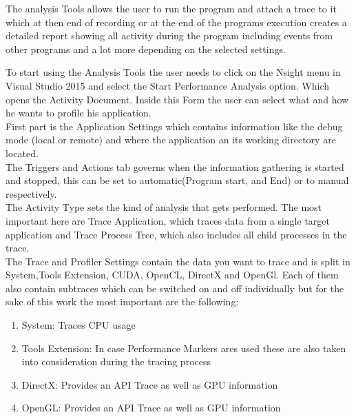 The analysis Tools allows the user to run the program and attach a trace to it which at then end of recording or at the end of the programs execution creates a detailed report showing all activity during the program including events from other programs and a lot more depending on the selected settings.

To start using the Analysis Tools the user needs to click on the Nsight menu in Visual Studio 2015 and select the Start Performance Analysis option. Which opens the Activity Document. Inside this Form the user can select what and how he wants to profile his application.\\
First part is the Application Settings which contains information like the debug mode (local or remote) and where the application an its working directory are located.\\
The Triggers and Actions tab governs when the information gathering is started and stopped, this can be set to automatic(Program start, and End) or to manual respectively.\\
The Activity Type sets the kind of analysis that gets performed. The most important here are Trace Application, which traces data from a single target application and Trace Process Tree, which also includes all child processes in the trace.\\
The Trace and Profiler Settings contain the data you want to trace and is split in System,Tools Extension, CUDA, OpenCL, DirectX and OpenGl. Each of them also contain subtraces which can be switched on and off individually but for the sake of this work the most important are the following:
\begin{enumerate}
\item System: Traces CPU usage
\item Tools Extension: In case Performance Markers ares used these are also taken into consideration during the tracing process
\item DirectX: Provides an API Trace as well as GPU information
\item OpenGL: Provides an API Trace as well as GPU information
\end{enumerate}

